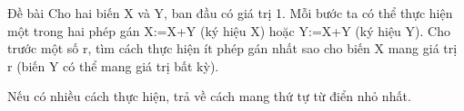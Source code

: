 Đề bài
Cho hai biến X và Y, ban đầu có giá trị 1. Mỗi bước ta có thể thực hiện một trong hai phép gán X:=X+Y (ký hiệu X) hoặc Y:=X+Y (ký hiệu Y). Cho trước một số r, tìm cách thực hiện ít phép gán nhất sao cho biến X mang giá trị r (biến Y có thể mang giá trị bất kỳ).  

   Nếu có nhiều cách thực hiện, trả về cách mang thứ tự từ điển nhỏ nhất.